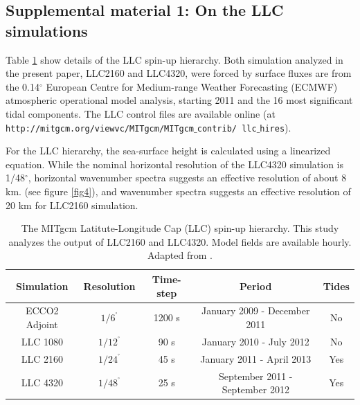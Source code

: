\documentclass[grl]{agutex2015}
\begin{document}
\begin{article}







\newpage
\section*{Supplemental material 1: On the LLC simulations}

Table \ref{tab:llc} show details of the LLC spin-up hierarchy.
Both simulation analyzed in the present paper, LLC2160 and LLC4320,
were forced by surface fluxes are from the 0.14$^\circ$ European Centre for
Medium-range Weather Forecasting (ECMWF) atmospheric operational model analysis,
 starting 2011 and the 16 most significant  tidal components.
The LLC control files are available online
(at \texttt{http://mitgcm.org/viewvc/MITgcm/MITgcm$\_$contrib/
llc$\_$hires}).

For the LLC hierarchy, the sea-surface height is calculated
using a linearized equation. While the nominal horizontal resolution  of the
LLC4320 simulation is 1/48$^\circ$,
horizontal wavenumber spectra suggests an effective resolution of about 8 km.
(see figure \ref{fig4}), and wavenumber spectra suggests an effective resolution
of 20 km for  LLC2160 simulation.

\begin{table}[ht]
\label{tab:llc}
\caption{\small The MITgcm Latitute-Longitude Cap (LLC) spin-up hierarchy. This study analyzes
         the output of LLC2160 and LLC4320. Model fields are available hourly.
         Adapted from \cite{rocha_etal2016}.}
\begin{center}
\begin{tabular}{ | c | c | c | c | c |}
\hline
Simulation & Resolution & Time-step & Period  & Tides \\ \hline
ECCO2 Adjoint & $1/6^{^\circ}$ & 1200 s & January 2009 - December 2011 & No\\
LLC 1080   & $1/12^{^\circ}$ & 90 s & January 2010 - July 2012 & No\\
LLC 2160   &  $1/24^{^\circ}$ & 45 s  & January 2011 - April 2013 & Yes\\
LLC 4320   &  $1/48^{^\circ}$ & 25 s & September 2011 - September 2012 & Yes \\
\hline
\end{tabular}
\end{center}
\end{table}


\end{article}
\end{document}
